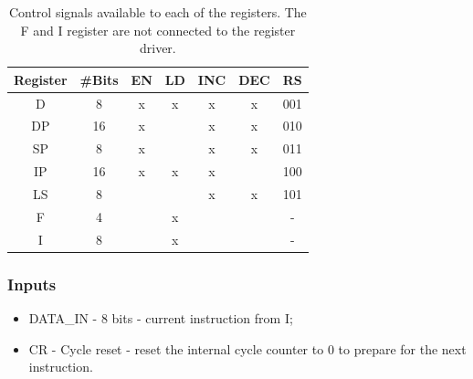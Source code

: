 \begin{table}[H]
  \centering
  \begin{tabular}{c|c|c|c|c|c|c}
    Register & \#Bits & EN  & LD  & INC  & DEC & RS \\ \hline 
    D        & 8     & x & x & x & x & 001 \\
    DP       & 16    & x &   & x & x & 010 \\ 
    SP       & 8     & x &   & x & x & 011 \\ 
    IP       & 16    & x & x & x &   & 100 \\ 
    LS       & 8     &   &   & x & x & 101 \\ 
    F        & 4     &   & x &   &   & -   \\ 
    I        & 8     &   & x &   &   & -   \\
  \end{tabular}
  \caption{Control signals available to each of the registers. The F and I register are not connected to the register driver.}
  \label{tab:registers}
\end{table}


\subsubsection*{Inputs}
\begin{itemize}
\itemsep0em
\item DATA\_IN - 8 bits - current instruction from I;
\item CR - Cycle reset - reset the internal cycle counter to 0 to prepare for the next instruction.
\end{itemize}

